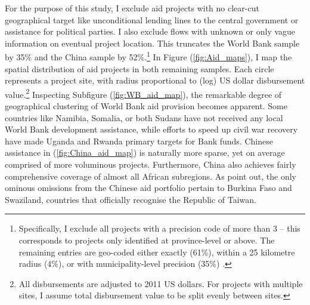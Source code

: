 \documentclass[11pt, oneside]{article}   	%
\let\oldref\ref
\renewcommand{\ref}[1]{(\oldref{#1})}
\begin{document}
For the purpose of this study, I exclude aid projects with no clear-cut geographical target like unconditional lending lines to the central government or assistance for political parties. I also exclude flows with unknown or only vague information on eventual project location. This truncates the World Bank sample by 35\% and the China sample by 52\%.\footnote{Specifically, I exclude all projects with a precision code of more than 3 -- this corresponds to projects only identified at province-level or above. The remaining entries are geo-coded either exactly (61\%), within a 25 kilometre radius (4\%), or with municipality-level precision (35\%) \citep{Strandow_UCDPAidDatacodebook_2011a}.} In Figure \ref{fig:Aid_maps}, I map the spatial distribution of aid projects in both remaining samples. Each circle represents a project site, with radius proportional to (log) US dollar disbursement value.\footnote{All disbursements are adjusted to 2011 US dollars. For projects with multiple sites, I assume total disbursement value to be split evenly between sites.} Inspecting Subfigure \ref{fig:WB_aid_map}, the remarkable degree of geographical clustering of World Bank aid provision becomes apparent. Some countries like Namibia, Somalia, or both Sudans have not received any local World Bank development assistance, while efforts to speed up civil war recovery have made Uganda and Rwanda primary targets for Bank funds. Chinese assistance in \ref{fig:China_aid_map} is naturally more sparse, yet on average comprised of more voluminous projects. Furthermore, China also achieves fairly comprehensive coverage of almost all African subregions. As \cite{Strange_TrackingUnderreportedFinancial_2017} point out, the only ominous omissions from the Chinese aid portfolio pertain to Burkina Faso and Swaziland, countries that officially recognise the Republic of Taiwan.
\end{document}
